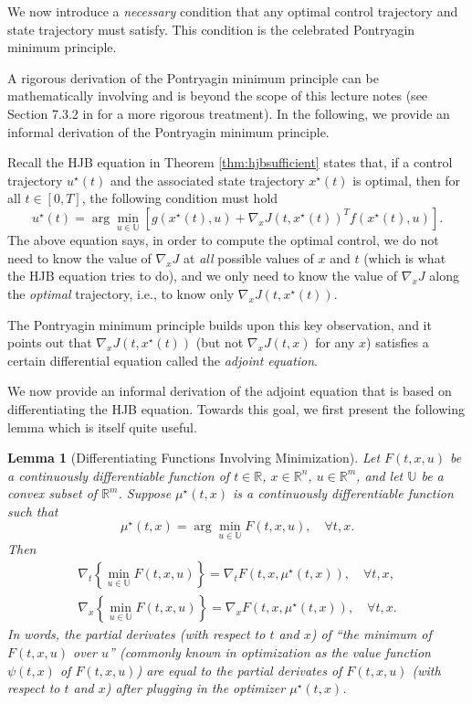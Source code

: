 \documentclass[
]{book}
\newtheorem{lemma}{Lemma}[chapter]
\theoremstyle{definition}
\theoremstyle{definition}
\theoremstyle{definition}
\theoremstyle{definition}
\theoremstyle{remark}
\begin{document}
We now introduce a \emph{necessary} condition that any optimal control trajectory and state trajectory must satisfy. This condition is the celebrated Pontryagin minimum principle.

A rigorous derivation of the Pontryagin minimum principle can be mathematically involving and is beyond the scope of this lecture notes (see Section 7.3.2 in \citep{bertsekas12book-dpocI} for a more rigorous treatment). In the following, we provide an informal derivation of the Pontryagin minimum principle.

Recall the HJB equation in Theorem \ref{thm:hjbsufficient} states that, if a control trajectory \(u^\star(t)\) and the associated state trajectory \(x^\star(t)\) is optimal, then for all \(t \in [0,T]\), the following condition must hold
\begin{equation}
u^\star(t) = \arg\min_{u \in \mathbb{U}} \left[ g(x^\star(t),u) + \nabla_x J(t,x^\star(t))^T f(x^\star(t),u)  \right] 
\label{eq:pmp-intro-from-hjb}.
\end{equation}
The above equation says, in order to compute the optimal control, we do not need to know the value of \(\nabla_x J\) at \emph{all} possible values of \(x\) and \(t\) (which is what the HJB equation tries to do), and we only need to know the value of \(\nabla_x J\) along the \emph{optimal} trajectory, i.e., to know only \(\nabla_x J(t,x^\star(t))\).

The Pontryagin minimum principle builds upon this key observation, and it points out that \(\nabla_x J(t,x^\star(t))\) (but not \(\nabla_x J(t,x)\) for any \(x\)) satisfies a certain differential equation called the \emph{adjoint equation}.

We now provide an informal derivation of the adjoint equation that is based on differentiating the HJB equation. Towards this goal, we first present the following lemma which is itself quite useful.

\begin{lemma}[Differentiating Functions Involving Minimization]
\protect\hypertarget{lem:gradientofminimumfunctions}{}\label{lem:gradientofminimumfunctions}Let \(F(t,x,u)\) be a continuously differentiable function of \(t \in \mathbb{R}\), \(x \in \mathbb{R}^n\), \(u \in \mathbb{R}^m\), and let \(\mathbb{U}\) be a convex subset of \(\mathbb{R}^m\). Suppose \(\mu^\star(t,x)\) is a continuously differentiable function such that
\[
\mu^\star(t,x) = \arg\min_{u \in \mathbb{U}} F(t,x,u), \quad \forall t,x.
\]
Then
\begin{align}
\nabla_t \left\{ \min_{u \in \mathbb{U}} F(t,x,u) \right\} = \nabla_t F(t,x,\mu^\star(t,x)), \quad \forall t,x, \\
\nabla_x \left\{ \min_{u \in \mathbb{U}} F(t,x,u) \right\} = \nabla_x F(t,x,\mu^\star(t,x)), \quad \forall t,x.
\end{align}
In words, the partial derivates (with respect to \(t\) and \(x\)) of ``the minimum of \(F(t,x,u)\) over \(u\)'' (commonly known in optimization as the value function \(\psi(t,x)\) of \(F(t,x,u)\)) are equal to the partial derivates of \(F(t,x,u)\) (with respect to \(t\) and \(x\)) after plugging in the optimizer \(\mu^\star(t,x)\).
\end{lemma}
\end{document}
